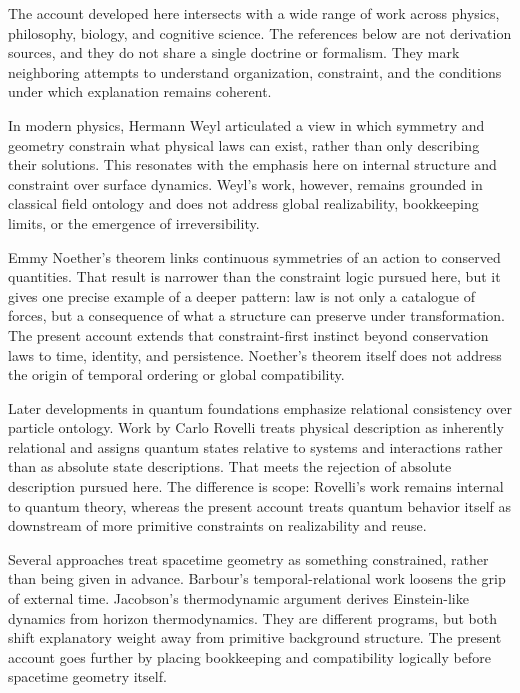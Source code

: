 \documentclass[11pt,twoside,openright]{book}
\begin{document}
The account developed here intersects with a wide range of work across physics,
philosophy, biology, and cognitive science.
The references below are not derivation sources,
and they do not share a single doctrine or formalism.
They mark neighboring attempts to understand organization,
constraint,
and the conditions under which explanation remains coherent.

In modern physics, Hermann Weyl articulated a view in which symmetry and geometry
constrain what physical laws can exist, rather than only describing their solutions.
This resonates with the emphasis here on internal structure and constraint over surface
dynamics. Weyl's work, however, remains grounded in classical field ontology and does
not address global realizability, bookkeeping limits, or the emergence of irreversibility.

Emmy Noether's theorem links continuous symmetries of an action to conserved
quantities.
That result is narrower than the constraint logic pursued here,
but it gives one precise example of a deeper pattern:
law is not only a catalogue of forces,
but a consequence of what a structure can preserve under transformation.
The present account extends that constraint-first instinct beyond conservation laws
to time, identity, and persistence.
Noether's theorem itself does not address the origin of temporal ordering or global
compatibility.

Later developments in quantum foundations emphasize relational consistency over particle
ontology. Work by Carlo Rovelli treats physical description as inherently relational and
assigns quantum states relative to systems and interactions rather than as absolute
state descriptions.
That meets the rejection of absolute description pursued here.
The difference is scope:
Rovelli's work remains internal to quantum theory,
whereas the present account treats quantum behavior itself as downstream of more
primitive constraints on realizability and reuse.

Several approaches treat spacetime geometry as something constrained,
rather than being given in advance.
Barbour's temporal-relational work loosens the grip of external time.
Jacobson's thermodynamic argument derives Einstein-like dynamics from horizon
thermodynamics.
They are different programs,
but both shift explanatory weight away from primitive background structure.
The present account goes further by placing bookkeeping and compatibility logically
before spacetime geometry itself.
\end{document}
